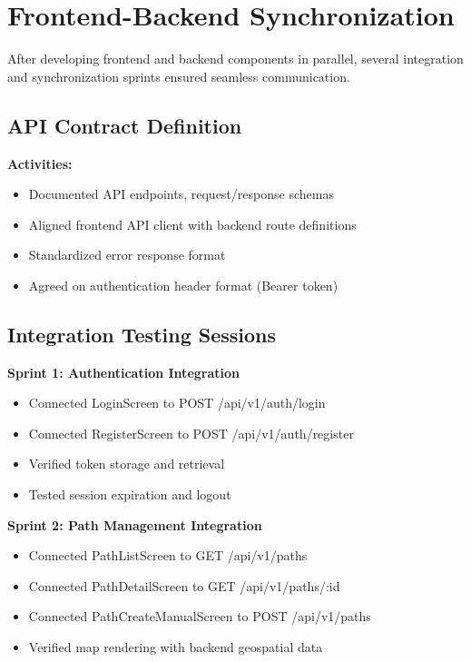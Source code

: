 \section{Frontend-Backend Synchronization}
\label{sec:synchronization}

After developing frontend and backend components in parallel, several integration and synchronization sprints ensured seamless communication.

\subsection{API Contract Definition}
\label{subsec:api_contract}

\textbf{Activities:}
\begin{itemize}
    \item Documented API endpoints, request/response schemas
    \item Aligned frontend API client with backend route definitions
    \item Standardized error response format
    \item Agreed on authentication header format (Bearer token)
\end{itemize}

\subsection{Integration Testing Sessions}
\label{subsec:integration_sessions}

\textbf{Sprint 1: Authentication Integration}
\begin{itemize}
    \item Connected LoginScreen to POST /api/v1/auth/login
    \item Connected RegisterScreen to POST /api/v1/auth/register
    \item Verified token storage and retrieval
    \item Tested session expiration and logout
\end{itemize}

\textbf{Sprint 2: Path Management Integration}
\begin{itemize}
    \item Connected PathListScreen to GET /api/v1/paths
    \item Connected PathDetailScreen to GET /api/v1/paths/:id
    \item Connected PathCreateManualScreen to POST /api/v1/paths
    \item Verified map rendering with backend geospatial data
\end{itemize}

